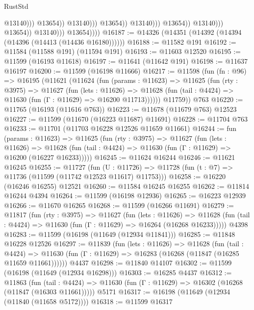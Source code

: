 \begin{lexlean}{RustStd}
\begin{coremodule}
                                                          @13140)))
                                                    @13654))
                                                @13140)))
                                          @13654))
                                      @13140)))
                                @13654))
                            @13140)))
                      @13654))
                  @13140)))
            @13654))))
@16187 := @14326 (@14351 (@14392 (@14394 (@14396 (@14413 (@14436 @16180))))))
@16188 := @11582 @191
@16192 := @11584 (@11588 @191) (@11594 @191)
@16193 := @11603 @12520
@16195 := @11599 (@16193 @11618)
@16197 := @11641 (@11642 @191)
@16198 := @11637 @16197
@16200 := @11599 (@16198 @11666)
@16217 := @11598
    (fun (fn : @96) =>
    @16195
      (@11621
        (@11624
          (fun (params : @11623) =>
          @11625
            (fun (rty : @3975) =>
            @11627
              (fun (lets : @11626) =>
              @11628 (fun (tail : @4424) => @11630 (fun (Γ : @11629) => @16200 @11713))))))
        @11759))
    @763
@16220 := @11765 (@16193 (@11616 @763))
@16223 := @11678 (@11679 @763) @12523
@16227 := @11599 (@11670 (@16223 @11687) @11691)
@16228 := @11704 @763
@16233 := @11701 (@11703 @16228 @12526 @11659 @11661)
@16244 := fun (params : @11623) =>
  @11625
    (fun (rty : @3975) =>
    @11627
      (fun (lets : @11626) =>
      @11628 (fun (tail : @4424) => @11630 (fun (Γ : @11629) => @16200 (@16227 @16233)))))
@16245 := @11624 @16244
@16246 := @11621 @16245
@16255 := @11727
    (fun (U : @11726) => @11728 (fun (t : @7) => @11736 (@11599 (@11742 @12523 @11617) @11753)))
@16258 := @16220 (@16246 @16255) @12521
@16260 := @11584 @16245 @16255
@16262 := @11814 @16244 @4394
@16264 := @11599 (@16198 @12936)
@16265 := @16223 @12939
@16266 := @11670 @16265
@16268 := @11599 (@16266 @11691)
@16279 := @11817
    (fun (rty : @3975) =>
    @11627
      (fun (lets : @11626) =>
      @11628 (fun (tail : @4424) => @11630 (fun (Γ : @11629) => @16264 (@16268 @16233)))))
    @4398
@16283 := @11599 (@16198 (@11649 (@12934 @11841)))
@16285 := @11848 @16228 @12526
@16297 := @11839
    (fun (lets : @11626) =>
    @11628
      (fun (tail : @4424) =>
      @11630 (fun (Γ : @11629) => @16283 (@16268 (@11847 (@16285 @11659 @11661))))))
    @4437
@16298 := @11840 @14107
@16302 := @11599 (@16198 (@11649 (@12934 @16298)))
@16303 := @16285 @4437
@16312 := @11863
    (fun (tail : @4424) => @11630 (fun (Γ : @11629) => @16302 (@16268 (@11847 (@16303 @11661)))))
    @5171
@16317 := @16198 (@11649 (@12934 (@11840 (@11658 @5172))))
@16318 := @11599 @16317

\end{coremodule}
\end{lexlean}
